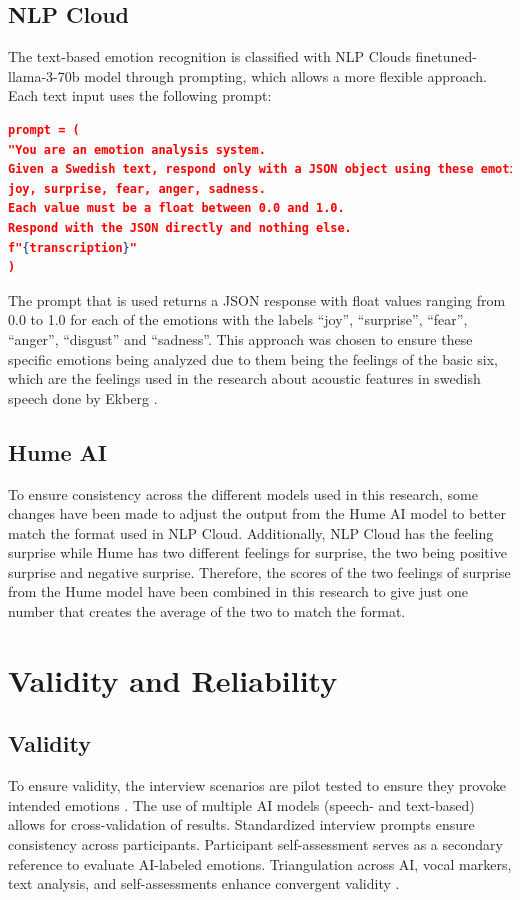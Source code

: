 \subsection{NLP Cloud}
\label{sec:method-nlp}
The text-based emotion recognition is classified with NLP Clouds finetuned-llama-3-70b model
through prompting, which allows a more flexible approach.
Each text input uses the following prompt:
\begin{center}
    \begin{minipage}{0.7\textwidth} 
    \begin{lstlisting}[language=json, caption={NLP Cloud configuration prompt.}]
prompt = (
"You are an emotion analysis system.
Given a Swedish text, respond only with a JSON object using these emotion labels: 
joy, surprise, fear, anger, sadness.
Each value must be a float between 0.0 and 1.0.
Respond with the JSON directly and nothing else.
f"{transcription}"
)
    \end{lstlisting}
    \end{minipage}
\end{center} 
The prompt that is used returns a JSON response with float values ranging from 0.0 to 1.0 for each of
the emotions with the labels “joy”, “surprise”, “fear”, “anger”, “disgust” and “sadness”. This approach
was chosen to ensure these specific emotions being analyzed due to them being the feelings of the basic
six, which are the feelings used in the research about acoustic features in swedish speech done by
Ekberg \autocite{Ekberg2023}. 

\subsection{Hume AI}
To ensure consistency across the different models used in this research, some changes have been
made to adjust the output from the Hume AI model to better match the format used in NLP Cloud.
Additionally, NLP Cloud has the feeling surprise while Hume has two different feelings for surprise,
the two being positive surprise and negative surprise. Therefore, the scores of the two feelings of
surprise from the Hume model have been combined in this research to give just one number that
creates the average of the two to match the format.

\section{Validity and Reliability}
\subsection{Validity}
To ensure validity, the interview scenarios are pilot tested to ensure they provoke intended emotions \autocite{Bryman2022}. The use of multiple AI models (speech- and text-based) allows for cross-validation of results. Standardized interview prompts ensure consistency across participants. Participant self-assessment serves as a secondary reference to evaluate AI-labeled emotions. Triangulation across AI, vocal markers, text analysis, and self-assessments enhance convergent validity \autocite{Creswell2023}. 

